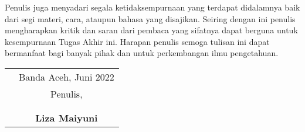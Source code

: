 
Penulis juga menyadari segala ketidaksempurnaan yang terdapat didalamnya baik dari segi materi, cara, ataupun bahasa yang disajikan. Seiring dengan ini penulis mengharapkan kritik dan saran dari pembaca yang sifatnya dapat berguna untuk kesempurnaan Tugas Akhir ini. Harapan penulis semoga tulisan ini dapat bermanfaat bagi banyak pihak dan untuk perkembangan ilmu pengetahuan.

\vspace{0.5cm}


\begin{tabular}{p{7.5cm}c}
	 & Banda Aceh, Juni 2022 \\
	 & Penulis,              \\
	 &                       \\
	 &                       \\
	 & \textbf{Liza Maiyuni}
\end{tabular}